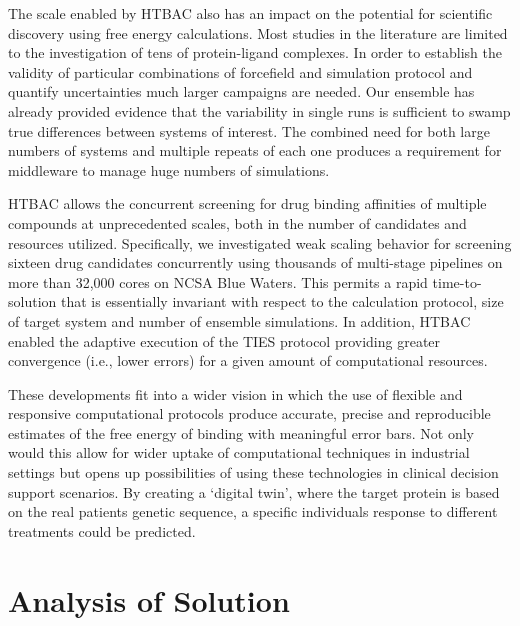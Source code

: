 \documentclass[conference]{IEEEtran}
\begin{document}
The scale enabled by HTBAC also has an impact on the potential for scientific discovery using free energy calculations. 
Most studies in the literature are limited to the investigation of tens of protein-ligand complexes.
In order to establish the validity of particular combinations of forcefield and simulation protocol and 
quantify uncertainties much larger campaigns are needed.
Our ensemble has already provided evidence that the variability in single runs is sufficient to 
swamp true differences between systems of interest.
The combined need for both large numbers of systems and multiple repeats of each one produces a requirement 
for middleware to manage huge numbers of simulations.

HTBAC allows the concurrent screening
for drug binding affinities of multiple compounds at unprecedented scales,
both in the number of candidates and resources utilized. Specifically, we
investigated weak scaling behavior for screening sixteen drug candidates
concurrently using thousands of multi-stage pipelines on more than 32,000
cores on NCSA Blue Waters. This permits a rapid time-to-solution that is 
essentially invariant with respect to the calculation protocol, 
size of target system and number of ensemble simulations. In addition,
HTBAC enabled the adaptive execution of the TIES protocol
providing greater convergence (i.e., lower errors) for a given amount of
computational resources. 

These developments fit into a wider vision in which the use of
flexible and responsive computational protocols produce accurate,
precise and reproducible estimates of the free energy of binding with 
meaningful error bars. Not only would this allow for wider uptake of 
computational techniques in industrial settings but opens up possibilities 
of using these technologies in clinical decision support scenarios. By creating 
a `digital twin', where the target protein is based on the real patients 
genetic sequence, a specific individuals response to different 
treatments could be predicted. 


\section{Analysis of Solution}\label{sec:analysis}
\end{document}

